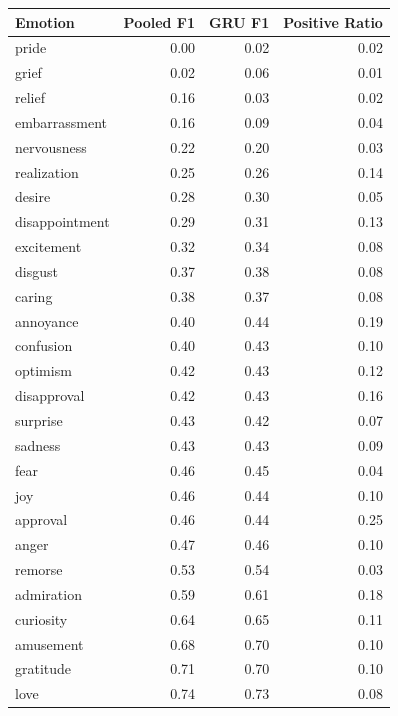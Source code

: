 \documentclass[conference]{IEEEtran}
\begin{document}
\begin{center}
\begin{tabular}{lrrr}
\toprule
       Emotion &  Pooled F1 &  GRU F1 &  Positive Ratio \\
\hline
         pride &       0.00 &    0.02 &            0.02 \\
         grief &       0.02 &    0.06 &            0.01 \\
        relief &       0.16 &    0.03 &            0.02 \\
 embarrassment &       0.16 &    0.09 &            0.04 \\
   nervousness &       0.22 &    0.20 &            0.03 \\
   realization &       0.25 &    0.26 &            0.14 \\
        desire &       0.28 &    0.30 &            0.05 \\
disappointment &       0.29 &    0.31 &            0.13 \\
    excitement &       0.32 &    0.34 &            0.08 \\
       disgust &       0.37 &    0.38 &            0.08 \\
        caring &       0.38 &    0.37 &            0.08 \\
     annoyance &       0.40 &    0.44 &            0.19 \\
     confusion &       0.40 &    0.43 &            0.10 \\
      optimism &       0.42 &    0.43 &            0.12 \\
   disapproval &       0.42 &    0.43 &            0.16 \\
      surprise &       0.43 &    0.42 &            0.07 \\
       sadness &       0.43 &    0.43 &            0.09 \\
          fear &       0.46 &    0.45 &            0.04 \\
           joy &       0.46 &    0.44 &            0.10 \\
      approval &       0.46 &    0.44 &            0.25 \\
         anger &       0.47 &    0.46 &            0.10 \\
       remorse &       0.53 &    0.54 &            0.03 \\
    admiration &       0.59 &    0.61 &            0.18 \\
     curiosity &       0.64 &    0.65 &            0.11 \\
     amusement &       0.68 &    0.70 &            0.10 \\
     gratitude &       0.71 &    0.70 &            0.10 \\
          love &       0.74 &    0.73 &            0.08 \\
\bottomrule
\end{tabular}
\end{center}
\end{document}
